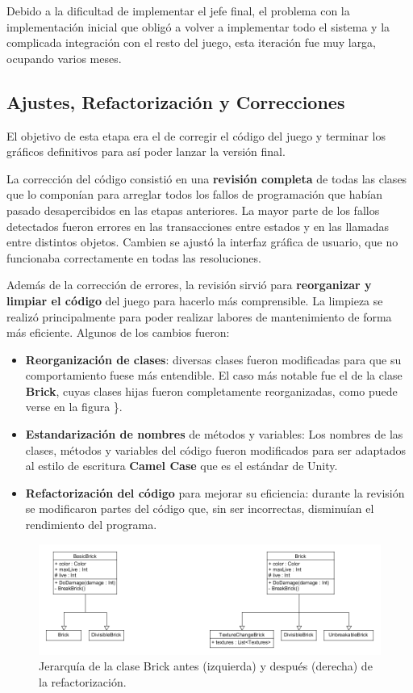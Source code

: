 Debido a la dificultad de implementar el jefe final, el problema con la implementación inicial que obligó a volver a implementar todo el sistema y la complicada integración con el resto del juego, esta iteración fue muy larga, ocupando varios meses.

\subsection{Ajustes, Refactorización y Correcciones}
El objetivo de esta etapa era el de corregir el código del juego y terminar los gráficos definitivos para así poder lanzar la versión final.

La corrección del código consistió en una \textbf{revisión completa} de todas las clases que lo componían para arreglar todos los fallos de programación que habían pasado desapercibidos en las etapas anteriores. La mayor parte de los fallos detectados fueron errores en las transacciones entre estados y en las llamadas entre distintos objetos. Cambien se ajustó la interfaz gráfica de usuario, que no funcionaba correctamente en todas las resoluciones.

Además de la corrección de errores, la revisión sirvió para \textbf{reorganizar y limpiar el código} del juego para hacerlo más comprensible. La limpieza se realizó principalmente para poder realizar labores de mantenimiento de forma más eficiente. Algunos de los cambios fueron:
\begin{itemize}
\item \textbf{Reorganización de clases}: diversas clases fueron modificadas para que su comportamiento fuese más entendible. El caso más notable fue el de la clase \textbf{Brick}, cuyas clases hijas fueron completamente reorganizadas, como puede verse en la figura \}.
\item \textbf{Estandarización de nombres} de métodos y variables: Los nombres de las clases, métodos y variables del código fueron modificados para ser adaptados al estilo de escritura \textbf{Camel Case} que es el estándar de Unity.
\item \textbf{Refactorización del código} para mejorar su eficiencia: durante la revisión se modificaron partes del código que, sin ser incorrectas, disminuían el rendimiento del programa.
\end{itemize}
\begin{figure}[!t]
    \centering
    \includegraphics[width=1\textwidth]{images/resultados/desarrollo/bick_comparation}
    \caption{Jerarquía de la clase Brick antes (izquierda) y después (derecha) de la refactorización.}
    \label{bick_comparation}
\end{figure}

